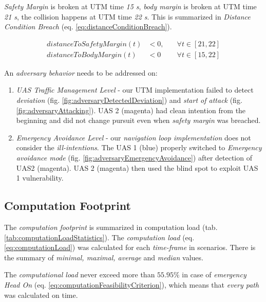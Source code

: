 \emph{Safety Margin} is broken at UTM time \emph{15 s}, \emph{body margin} is broken at UTM time \emph{21 s}, the collision happens at  UTM time \emph{22 s}. This is summarized in \emph{Distance Condition Breach} (eq. \ref{eq:distanceConditionBreach}).

\begin{equation}\label{eq:distanceConditionBreach}
    \begin{aligned}
    distanceToSafetyMargin(t) &< 0,\quad &\forall t \in [21,22]\\
    distanceToBodyMargin(t)  &< 0 \quad &\forall t \in [15,22]
    \end{aligned}
\end{equation}

\begin{note}
    An \emph{adversary behavior} needs to be addressed on:
    \begin{enumerate}
        \item  \emph{UAS Traffic Management Level} -  our UTM implementation failed to detect \emph{deviation} (fig. \ref{fig:adversaryDetectedDeviation}) and \emph{start of attack} (fig. \ref{fig:adversaryAttacking}). UAS 2 (magenta) had clean intention from the beginning and did not change pursuit even when \emph{safety margin} was breached. 
        
        \item  \emph{Emergency Avoidance Level} - our \emph{navigation loop implementation} does not consider the \emph{ill-intentions}. The UAS 1 (blue) properly switched to \emph{Emergency avoidance mode} (fig. \ref{fig:adversaryEmergencyAvoidance}) after detection of UAS2 (magenta). UAS 2 (magenta) then used the blind spot to exploit UAS 1 vulnerability.   
    \end{enumerate}
\end{note}

\subsection{Computation Footprint}\label{s:ComputaitonFootprint}

\noindent The \emph{computation footprint} is summarized in computation  load (tab. \ref{tab:computationLoadStatistics}). The \emph{computation load} (eq. \ref{eq:computationLoad}) was calculated for each \emph{time-frame} in scenarios. There is the summary of \emph{minimal, maximal, average} and \emph{median} values.

The \emph{computational load} never exceed more than $55.95\%$ in case of  \emph{emergency Head On} (eq. \ref{eq:computationFeasibilityCriterion}), which means that \emph{every path} was calculated on time.

